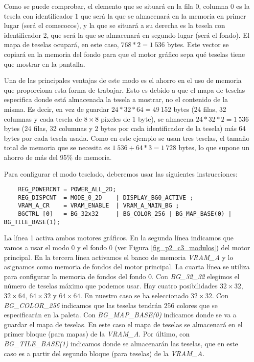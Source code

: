 Como se puede comprobar, el elemento que se situará en la fila 0, columna 0 es la tesela con identificador 1 que será la que se almacenará en la memoria en primer lugar (será el comecocos), y la que se situará a su derecha es la tesela con identificador 2, que será la que se almacenará en segundo lugar (será el fondo). El mapa de teselas ocupará, en este caso, $768*2=1\ 536$ bytes. Este vector se copiará en la memoria del fondo para que el motor gráfico sepa qué teselas tiene que mostrar en la pantalla.

Una de las principales ventajas de este modo es el ahorro en el uso de memoria que proporciona esta forma de trabajar. Esto es debido a que el mapa de teselas especifica donde está almacenada la tesela a mostrar, no el contenido de la misma. Es decir, en vez de guardar $24*32*64 = 49\ 152$ bytes (24 filas, 32 columnas y cada tesela de $8\times8$ píxeles de 1 byte), se almacena $24*32*2 = 1\ 536$ bytes (24 filas, 32 columnas y 2 bytes por cada identificador de la tesela) más 64 bytes por cada tesela usada. Como en este ejemplo se usan tres teselas, el tamaño total de memoria que se necesita es $1\ 536 + 64*3 = 1\ 728$ bytes, lo que supone un ahorro de más del 95\% de memoria.

Para configurar el modo teselado, deberemos usar las siguientes instrucciones:

\begin{lstlisting}
	REG_POWERCNT = POWER_ALL_2D;
	REG_DISPCNT  = MODE_0_2D    | DISPLAY_BG0_ACTIVE ;
	VRAM_A_CR    = VRAM_ENABLE  | VRAM_A_MAIN_BG ;
	BGCTRL [0]   = BG_32x32     | BG_COLOR_256 | BG_MAP_BASE(0) | BG_TILE_BASE(1);
\end{lstlisting}

La línea 1 activa ambos motores gráficos. En la segunda línea indicamos que vamos a usar el modo 0 y el fondo 0 (ver Figura \ref{fig_p2_c3_modulos}) del motor principal. En la tercera línea activamos el banco de memoria \textit{VRAM\_A} y lo asignamos como memoria de fondos del motor principal. La cuarta línea se utiliza para configurar la memoria de fondos del fondo 0. Con \textit{BG\_32\_32} elegimos el número de teselas máximo que podemos usar. Hay cuatro posibilidades $32\times32$, $32\times64$, $64\times32$ y $64\times64$. En nuestro caso se ha seleccionado $32\times32$. Con \textit{BG\_COLOR\_256} indicamos que las teselas tendrán 256 colores que se especificarán en la paleta. Con \textit{ BG\_MAP\_BASE(0)} indicamos donde se va a guardar el mapa de teselas. En este caso el mapa de teselas se almacenará en el primer bloque (para mapas) de la \textit{VRAM\_A}. Por último, con \textit{BG\_TILE\_BASE(1)} indicamos donde se almacenarán las teselas, que en este caso es a partir del segundo bloque (para teselas) de la \textit{VRAM\_A}.

